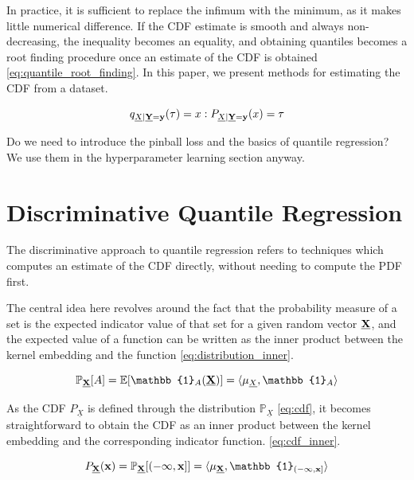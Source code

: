 \documentclass[twoside]{article} \usepackage{aistats2017}
\theoremstyle{definition}
\theoremstyle{remark}
\newcommand{\rv}[1]{\underline{#1}}
\newcommand{\warn}[1]{{\color{RedOrange} #1}}
\begin{document}
		In practice, it is sufficient to replace the infimum with the minimum, as it makes little numerical difference. If the CDF estimate is smooth and always non-decreasing, the inequality becomes an equality, and obtaining quantiles becomes a root finding procedure once an estimate of the CDF is obtained \eqref{eq:quantile_root_finding}. In this paper, we present methods for estimating the CDF from a dataset.
		
		\begin{equation}
			q_{\rv{X} | \bvec{\rv{Y}} = \bvec{y}}(\tau) = x : P_{\rv{X} | \bvec{\rv{Y}} = \bvec{y}}(x) = \tau
		\label{eq:quantile_root_finding}
		\end{equation}	
	
		\warn{Do we need to introduce the pinball loss and the basics of quantile regression? We use them in the hyperparameter learning section anyway.}

\section{Discriminative Quantile Regression}
\label{sec:discriminative_quantile_regression}

	The discriminative approach to quantile regression refers to techniques which computes an estimate of the CDF directly, without needing to compute the PDF first.
	
	The central idea here revolves around the fact that the probability measure of a set is the expected indicator value of that set for a given random vector $\bvec{\rv{X}}$, and the expected value of a function can be written as the inner product between the kernel embedding and the function \eqref{eq:distribution_inner}.
	
	\begin{equation}
		\mathbb{P}_{\bvec{\rv{X}}}[A] = \mathbb{E}[\mathbb{1}_{A}(\bvec{\rv{X}})] = \langle \mu_{\rv{X}}, \mathbb{1}_{A} \rangle
	\label{eq:distribution_inner}
	\end{equation}
	
	As the CDF $P_{\rv{X}}$ is defined through the distribution $\mathbb{P}_{\rv{X}}$ \eqref{eq:cdf}, it becomes straightforward to obtain the CDF as an inner product between the kernel embedding and the corresponding indicator function. \eqref{eq:cdf_inner}.
	
	\begin{equation}
		P_{\bvec{\rv{X}}}(\bvec{x}) = \mathbb{P}_{\bvec{\rv{X}}}[(-\bvec{\infty}, \bvec{x}]] = \langle \mu_{\bvec{\rv{X}}}, \mathbb{1}_{(-\bvec{\infty}, \bvec{x}]} \rangle
	\label{eq:cdf_inner}
	\end{equation}
	
\end{document}
